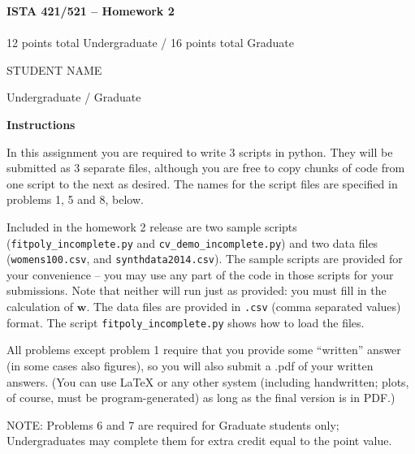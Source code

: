 \documentclass[10pt]{article}
\newcommand{\latex}{\LaTeX\xspace}
\begin{document}
\begin{center}
    {\Large {\bf ISTA 421/521 -- Homework 2}} \\
     \\
    12 points total Undergraduate / 16 points total Graduate
\end{center}

\begin{flushright}
STUDENT NAME %

Undergraduate / Graduate %
\end{flushright}

\vspace{1cm}
{\Large {\bf Instructions}}

In this assignment you are required to write 3 scripts in python.  They will be submitted as 3 separate files, although you are free to copy chunks of code from one script to the next as desired.  The names for the script files are specified in problems 1, 5 and 8, below.

Included in the homework 2 release are two sample scripts ({\tt fitpoly\_incomplete.py} and {\tt cv\_demo\_incomplete.py}) and two data files ({\tt womens100.csv}, and {\tt synthdata2014.csv}).  The sample scripts are provided for your convenience -- you may use any part of the code in those scripts for your submissions.  Note that neither will run just as provided: you must fill in the calculation of $\mathbf{w}$.  The data files are provided in {\tt .csv} (comma separated values) format.  The script {\tt fitpoly\_incomplete.py} shows how to load the files.

All problems except problem 1 require that you provide some ``written'' answer (in some cases also figures), so you will also submit a .pdf of your written answers.  (You can use \latex or any other system (including handwritten; plots, of course, must be program-generated) as long as the final version is in PDF.)


NOTE: Problems 6 and 7 are required for Graduate students only; Undergraduates may complete them for extra credit equal to the point value.
\end{document}
